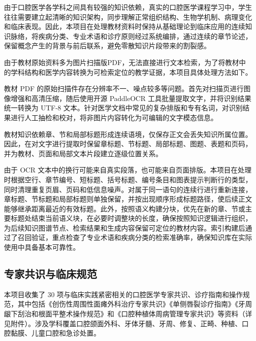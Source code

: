 由于口腔医学各学科之间具有较强的知识依赖，真实的口腔医学课程学习中，学生往往需要建立起清晰的知识架构，同步理解正常组织结构、生物学机制、病理变化和临床表现。因此，本项目在处理教材资料时保持从基础理论到临床应用的连续知识脉络，将疾病分类、专业术语和诊疗原则经过系统编排，通过连续的章节论述，保留概念产生的背景与前后联系，避免零散知识片段带来的割裂感。

由于教材原始资料多为图片扫描版PDF，无法直接进行文本检索，为了将教材中的学科结构和医学内容转换为可检索定位的教学证据，本项目具体处理方法如下。

\nopagebreak[4]

教材 PDF 的原始扫描件存在分辨率不一、噪点较多等问题。首先对扫描页进行图像增强和高清压缩，随后使用开源 PaddleOCR 工具批量提取文字，并将识别结果统一转换为 UTF-8 文本。针对医学文档中常见的复杂排版和专有名词，对识别结果进行人工抽检和校对，将非图片内容转化为可编辑的文字模态信息。


教材知识依赖章、节和局部标题形成连续语境，仅保存正文会丢失知识所属位置。因此，在对文字进行提取时保留章标题、节标题、局部标题、图题、表题和页码，并为教材、页面和局部文本片段建立逐级位置关系。


由于 OCR 文本中的换行可能来自真实段落，也可能来自页面排版。本项目在处理时根据空行、章节编号、短标题、括号标题、编号条目和图表提示判断行的类型，同时清理重复页眉、页码和低信息噪声。对属于同一语句的连续行进行重新连接，章标题、节标题和局部标题则单独保留，并按出现顺序形成标题路径，使后续正文能够继承距离最近的有效标题。此外，按照语义构建分块，优先在新的章、节或主要标题处结束当前语义块，在必要时调整块的长度，确保按照知识逻辑进行组织，为后续知识图谱节点、检索结果和生成内容保留可定位的教材内容。索引构建后通过了召回验证，重点检查了专业术语和疾病分类的检索准确率，确保知识库在实际使用中具备基本可靠性。

\subsection{专家共识与临床规范}

本项目收集了 30 项与临床实践紧密相关的口腔医学专家共识、诊疗指南和操作规范，其中包括《创伤性周围性面瘫外科治疗专家共识》《单侧唇裂诊疗指南》《牙周龈下刮治和根面平整术操作规范》和《口腔种植体周病管理专家共识》等资料（详见附件）。涉及学科覆盖口腔颌面外科、牙体牙髓、牙周、修复、正畸、种植、口腔黏膜、儿童口腔和急诊处置。

